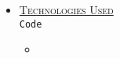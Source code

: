 \begin{itemize}
  \item[] \centering\large\textsc{\underline{Technologies Used}}\\\normalsize\texttt{Code}
  \begin{itemize}
    \item[] 
  \end{itemize}
\end{itemize}